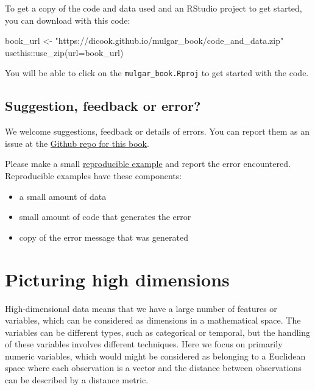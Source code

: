 \documentclass[
  letterpaper,
]{krantz}
\newenvironment{Shaded}{\begin{snugshade}}{\end{snugshade}}
\newcommand{\AttributeTok}[1]{\textcolor[rgb]{0.40,0.45,0.13}{#1}}
\newcommand{\FunctionTok}[1]{\textcolor[rgb]{0.28,0.35,0.67}{#1}}
\newcommand{\NormalTok}[1]{\textcolor[rgb]{0.00,0.23,0.31}{#1}}
\newcommand{\OtherTok}[1]{\textcolor[rgb]{0.00,0.23,0.31}{#1}}
\newcommand{\SpecialCharTok}[1]{\textcolor[rgb]{0.37,0.37,0.37}{#1}}
\newcommand{\StringTok}[1]{\textcolor[rgb]{0.13,0.47,0.30}{#1}}
\providecommand{\tightlist}{%
  \setlength{\itemsep}{0pt}\setlength{\parskip}{0pt}}\usepackage{longtable,booktabs,array}
\begin{document}
To get a copy of the code and data used and an RStudio project to get
started, you can download with this code:

\begin{Shaded}
\begin{Highlighting}[]
\NormalTok{book\_url }\OtherTok{\textless{}{-}} \StringTok{"https://dicook.github.io/mulgar\_book/code\_and\_data.zip"}
\NormalTok{usethis}\SpecialCharTok{::}\FunctionTok{use\_zip}\NormalTok{(}\AttributeTok{url=}\NormalTok{book\_url)}
\end{Highlighting}
\end{Shaded}

You will be able to click on the \texttt{mulgar\_book.Rproj} to get
started with the code.

\section*{Suggestion, feedback or
error?}\label{suggestion-feedback-or-error}


We welcome suggestions, feedback or details of errors. You can report
them as an issue at the
\href{https://github.com/dicook/mulgar_book}{Github repo for this book}.

Please make a small \href{https://reprex.tidyverse.org}{reproducible
example} and report the error encountered. Reproducible examples have
these components:

\begin{itemize}
\tightlist
\item
  a small amount of data
\item
  small amount of code that generates the error
\item
  copy of the error message that was generated
\end{itemize}


\chapter{Picturing high dimensions}\label{intro}

High-dimensional data means that we have a large number of features or
variables, which can be considered as dimensions in a mathematical
space. The variables can be different types, such as categorical or
temporal, but the handling of these variables involves different
techniques. Here we focus on primarily numeric variables, which would
might be considered as belonging to a Euclidean space where each
observation is a vector and the distance between observations can be
described by a distance metric. 
 
 
\end{document}
